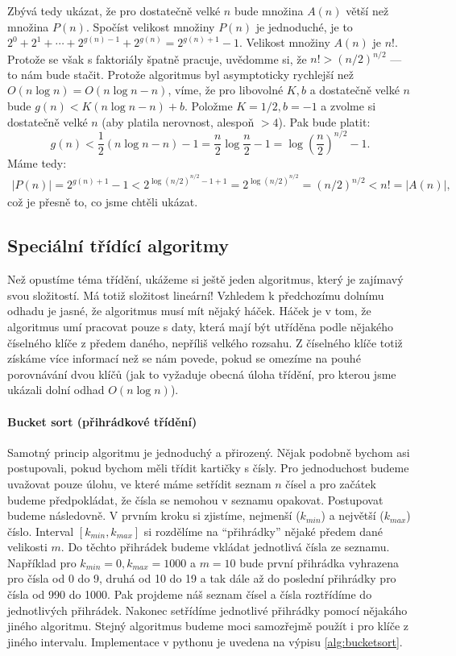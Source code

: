 Zbývá tedy ukázat, že pro dostatečně velké $n$ bude množina $A(n)$ větší než množina $P(n)$. Spočíst velikost množiny $P(n)$ je jednoduché, je to
$2^0 + 2^1 + \cdots + 2^{g(n)-1} + 2^{g(n)} = 2^{g(n)+1}-1$. Velikost množiny $A(n)$ je $n!$. Protože se však s faktoriály špatně pracuje, uvědomme si, že
$n!>(n/2)^{n/2}$ --- to nám bude stačit. Protože algoritmus byl asymptoticky rychlejší než $O(n\log n) = O(n\log n - n)$, víme, že pro libovolné $K,b$ a dostatečně velké $n$ bude $g(n)< K(n\log n -n)+b$.
Položme $K=1/2,b=-1$ a zvolme si dostatečně velké $n$ (aby platila nerovnost, alespoň $>4$). Pak bude platit:
\begin{displaymath}
 g(n) < \frac{1}{2}(n\log n-n) - 1 = \frac{n}{2}\log \frac{n}{2} - 1 = \log\left(\frac{n}{2}\right)^{n/2}-1.
\end{displaymath}
Máme tedy:
\begin{align*}
|P(n)| = 2^{g(n)+1}-1 < 2^{\log (n/2)^{n/2} - 1 +1} = 2^{\log (n/2)^{n/2}} = (n/2)^{n/2} < n! = |A(n)|,
\end{align*}
což je přesně to, co jsme chtěli ukázat.

\subsection*{Speciální třídící algoritmy}
Než opustíme téma třídění, ukážeme si ještě jeden algoritmus, který je zajímavý
svou složitostí. Má totiž složitost lineární! Vzhledem k předchozímu dolnímu odhadu je jasné, že algoritmus musí mít nějaký háček.
Háček je v tom, že algoritmus umí pracovat pouze s daty, která mají být utříděna
podle nějakého číselného klíče z předem daného, nepříliš velkého rozsahu.
Z číselného klíče totiž získáme více informací než se nám povede, pokud se omezíme na pouhé porovnávání dvou klíčů (jak to vyžaduje obecná úloha třídění, pro kterou jsme ukázali dolní odhad $O(n\log n)$).

\paragraph{Bucket sort (přihrádkové třídění)}
Samotný princip algoritmu je jednoduchý a přirozený. Nějak podobně bychom asi postupovali, pokud bychom měli třídit kartičky s čísly.
Pro jednoduchost budeme uvažovat pouze úlohu,
ve které máme setřídit seznam $n$ čísel a pro začátek budeme předpokládat, že čísla se nemohou v seznamu opakovat. Postupovat budeme následovně. V prvním kroku si zjistíme, nejmenší ($k_{min}$) a největší ($k_{max}$) číslo. Interval $[k_{min},k_{max}]$ si rozdělíme na ``přihrádky'' nějaké předem dané velikosti $m$. Do těchto přihrádek budeme vkládat jednotlivá čísla ze seznamu. Například pro $k_{min}=0,k_{max}=1000$ a $m=10$ bude první přihrádka vyhrazena pro čísla od 0 do 9, druhá od 10 do 19 a tak dále
až do poslední přihrádky pro čísla od 990 do 1000.
Pak projdeme náš seznam čísel a čísla roztřídíme do jednotlivých přihrádek.
Nakonec setřídíme jednotlivé přihrádky pomocí nějakáho jiného algoritmu.
Stejný algoritmus budeme moci samozřejmě použít i pro klíče z jiného intervalu.
Implementace v pythonu je uvedena na výpisu \ref{alg:bucketsort}.

